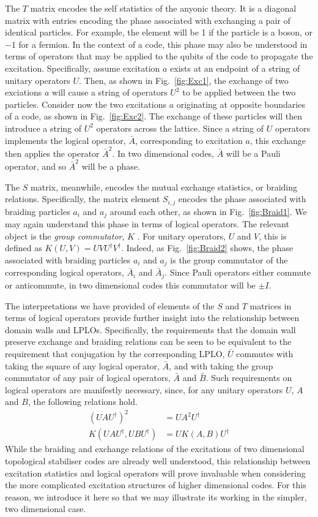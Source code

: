 \documentclass[pra,twocolumn,a4paper,nofootinbib]{revtex4-1}
\begin{document}
The $T$ matrix encodes the self statistics of the anyonic theory.  It is a diagonal matrix with entries encoding the phase associated with exchanging a pair of identical particles. For example, the element will be 1 if the particle is a boson, or $-1$ for a fermion. In the context of a code, this phase may also be understood in terms of operators that may be applied to the qubits of the code to propagate the excitation. Specifically, assume excitation $a$ exists at an endpoint of a string of unitary operators $U$. Then, as shown in Fig.~\ref{fig:Exc1}, the exchange of two exciations $a$ will cause a string of operators $U^2$ to be applied between the two particles. Consider now the two excitations $a$ originating at opposite boundaries of a code, as shown in Fig.~\ref{fig:Exc2}. The exchange of these particles will then introduce a string of $U^2$ operators across the lattice. Since a string of $U$ operators implements the logical operator, $\bar{A}$, corresponding to excitation $a$, this exchange then applies the operator $\bar{A}^2$. In two dimensional codes, $\bar{A}$ will be a Pauli operator, and so $\bar{A}^2$ will be a phase.

The $S$ matrix, meanwhile, encodes the mutual exchange statistics, or braiding relations. Specifically, the matrix element $S_{i,j}$ encodes the phase associated with braiding particles $a_i$ and $a_j$ around each other, as shown in Fig.~\ref{fig:Braid1}. We may again understand this phase in terms of logical operators. The relevant object is the \textit{group commutator}, $K$ \cite{YoshidaA}. For unitary operators, $U$ and $V$, this is defined as $K(U,V)=UVU^\dag V^\dag$. Indeed, as Fig.~\ref{fig:Braid2} shows, the phase associated with braiding particles $a_i$ and $a_j$ is the group commutator of the corresponding logical operators, $\bar{A}_i$ and $\bar{A}_j$. Since Pauli operators either commute or anticommute, in two dimensional codes this commutator will be $\pm I$.

The interpretations we have provided of elements of the $S$ and $T$ matrices in terms of logical operators provide further insight into the relationship between domain walls and LPLOs. Specifically, the requirements that the domain wall preserve exchange and braiding relations can be seen to be equivalent to the requirement that conjugation by the corresponding LPLO, $\bar{U}$ commutes with taking the square of any logical operator, $\bar{A}$, and with taking the group commutator of any pair of logical operators, $\bar{A}$ and $\bar{B}$. Such requirements on logical operators are manifestly necessary, since, for any unitary operators $U$, $A$ and $B$, the following relations hold.
\begin{align}
(UAU^\dag)^2 &=UA^2 U^\dag\\
K(UAU^\dag , UBU^\dag ) &= UK(A,B)U^\dag
\end{align}
While the braiding and exchange relations of the excitations of two dimensional topological stabiliser codes are already well understood, this relationship between excitation statistics and logical operators will prove invaluable when considering the more complicated excitation structures of higher dimensional codes. For this reason, we introduce it here so that we may illustrate its working in the simpler, two dimensional case.
\end{document}
